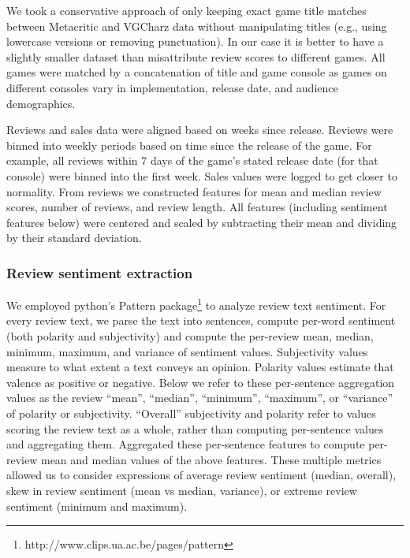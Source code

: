 \documentclass[letterpaper]{article}
\begin{document}
We took a conservative approach of only keeping exact game title matches between Metacritic and VGCharz data without manipulating titles (e.g., using lowercase versions or removing punctuation). In our case it is better to have a slightly smaller dataset than misattribute review scores to different games. All games were matched by a concatenation of title and game console as games on different consoles vary in implementation, release date, and audience demographics. 

Reviews and sales data were aligned based on weeks since release. Reviews were binned into weekly periods based on time since the release of the game. For example, all reviews within 7 days of the game's stated release date (for that console) were binned into the first week. Sales values were logged to get closer to normality. From reviews we constructed features for mean and median review scores, number of reviews, and review length. All features (including sentiment features below) were centered and scaled by subtracting their mean and dividing by their standard deviation.

\subsubsection{Review sentiment extraction}
We employed python's Pattern package\footnote{http://www.clips.ua.ac.be/pages/pattern} to analyze review text sentiment. For every review text, we parse the text into sentences, compute per-word sentiment (both polarity and subjectivity) and compute the per-review mean, median, minimum, maximum, and variance of sentiment values. Subjectivity values measure to what extent a text conveys an opinion. Polarity values estimate that valence as positive or negative. Below we refer to these per-sentence aggregation values as the review ``mean'', ``median'', ``minimum'', ``maximum'', or ``variance'' of polarity or subjectivity. ``Overall'' subjectivity and polarity refer to values scoring the review text as a whole, rather than computing per-sentence values and aggregating them. Aggregated these per-sentence features to compute per-review mean and median values of the above features. These multiple metrics allowed us to consider expressions of average review sentiment (median, overall), skew in review sentiment (mean vs median, variance), or extreme review sentiment (minimum and maximum).
\end{document}
